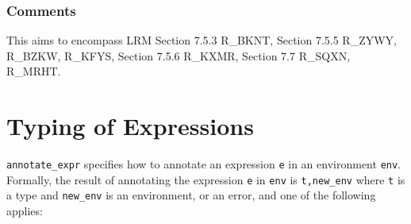 \documentclass{book}
\begin{document}
\subsection{Comments}
  This aims to encompass LRM Section 7.5.3 R\_BKNT, Section 7.5.5 R\_ZYWY, R\_BZKW,
  R\_KFYS, Section 7.5.6 R\_KXMR, Section 7.7 R\_SQXN, R\_MRHT.

\chapter{Typing of Expressions}

\texttt{annotate\_expr} specifies how to annotate an expression \texttt{e} in
an environment \texttt{env}.  Formally, the result of annotating the expression
\texttt{e} in \texttt{env} is \texttt{t,new\_env} where \texttt{t} is a type and
\texttt{new\_env} is an environment, or an error, and one of the following applies:
\begin{comment}
ROMAN: the environment here is actually an expression. We should probably explain why we returned a transformed expression.
\end{comment}
\end{document}

